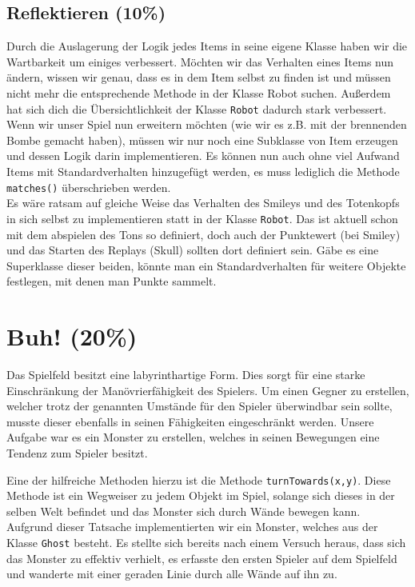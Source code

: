 \documentclass{pi1}
\begin{document}
\subsection{Reflektieren (10\%)}

Durch die Auslagerung der Logik jedes Items in seine eigene Klasse haben wir die Wartbarkeit um einiges verbessert. Möchten wir das Verhalten eines Items nun ändern, wissen wir genau, dass es in dem Item selbst zu finden ist und müssen nicht mehr die entsprechende Methode in der Klasse Robot suchen. Außerdem hat sich dich die Übersichtlichkeit der Klasse  \texttt{Robot} dadurch stark verbessert.\\
Wenn wir unser Spiel nun erweitern möchten (wie wir es z.B. mit der brennenden Bombe gemacht haben), müssen wir nur noch eine Subklasse von Item erzeugen und dessen Logik darin implementieren. Es können nun auch ohne viel Aufwand Items mit Standardverhalten hinzugefügt werden, es muss lediglich die Methode \texttt{matches()} überschrieben werden.\\
Es wäre ratsam auf gleiche Weise das Verhalten des Smileys und des Totenkopfs in sich selbst zu implementieren statt in der Klasse  \texttt{Robot}. Das ist aktuell schon mit dem abspielen des Tons so definiert, doch auch der Punktewert (bei Smiley) und das Starten des Replays (Skull) sollten dort definiert sein. Gäbe es eine Superklasse dieser beiden, könnte man ein Standardverhalten für weitere Objekte festlegen, mit denen man Punkte sammelt.

\section{Buh! (20\%)}
Das Spielfeld besitzt eine labyrinthartige Form. Dies sorgt für eine starke Einschränkung der Manövrierfähigkeit des Spielers.
Um einen Gegner zu erstellen, welcher trotz der genannten Umstände für den Spieler überwindbar sein sollte, musste dieser ebenfalls in seinen Fähigkeiten eingeschränkt werden.\newline
Unsere Aufgabe war es ein Monster zu erstellen, welches in seinen Bewegungen eine Tendenz zum Spieler besitzt.

Eine der hilfreiche Methoden hierzu ist die Methode \texttt{turnTowards(x,y)}. Diese Methode ist ein Wegweiser zu jedem Objekt im Spiel, solange sich dieses in der selben Welt befindet und das Monster sich durch Wände bewegen kann.
Aufgrund dieser Tatsache implementierten wir ein Monster, welches aus der Klasse  \texttt{Ghost} besteht.\newline
Es stellte sich bereits nach einem Versuch heraus, dass sich das Monster zu effektiv verhielt, es erfasste den ersten Spieler auf dem Spielfeld und wanderte mit einer geraden Linie durch alle Wände auf ihn zu.
\end{document}
